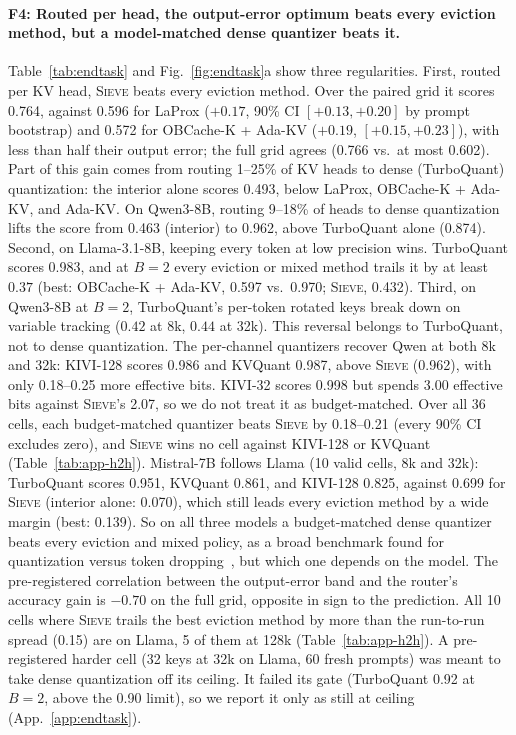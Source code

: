 \documentclass{article}
\newcommand{\sieve}{\textsc{Sieve}}
\theoremstyle{definition}
\begin{document}
\paragraph{F4: Routed per head, the output-error optimum beats every eviction method, but a model-matched dense quantizer beats it.}
Table~\ref{tab:endtask} and Fig.~\ref{fig:endtask}a show three regularities.  First, routed per KV head, \sieve{} beats every eviction method.  Over the paired grid it scores 0.764, against 0.596 for LaProx ($+0.17$, 90\% CI $[+0.13,+0.20]$ by prompt bootstrap) and 0.572 for OBCache-K + Ada-KV ($+0.19$, $[+0.15,+0.23]$), with less than half their output error; the full grid agrees (0.766 vs.\ at most 0.602).  Part of this gain comes from routing 1--25\% of KV heads to dense (TurboQuant) quantization: the interior alone scores 0.493, below LaProx, OBCache-K + Ada-KV, and Ada-KV.  On Qwen3-8B, routing 9--18\% of heads to dense quantization lifts the score from 0.463 (interior) to 0.962, above TurboQuant alone (0.874).  Second, on Llama-3.1-8B, keeping every token at low precision wins.  TurboQuant scores 0.983, and at $B=2$ every eviction or mixed method trails it by at least $0.37$ (best: OBCache-K + Ada-KV, 0.597 vs.\ 0.970; \sieve{}, 0.432).  Third, on Qwen3-8B at $B=2$, TurboQuant's per-token rotated keys break down on variable tracking ($0.42$ at 8k, $0.44$ at 32k).  This reversal belongs to TurboQuant, not to dense quantization.  The per-channel quantizers recover Qwen at both 8k and 32k: KIVI-128 scores 0.986 and KVQuant 0.987, above \sieve{} (0.962), with only 0.18--0.25 more effective bits.  KIVI-32 scores 0.998 but spends 3.00 effective bits against \sieve{}'s 2.07, so we do not treat it as budget-matched.  Over all 36 cells, each budget-matched quantizer beats \sieve{} by 0.18--0.21 (every 90\% CI excludes zero), and \sieve{} wins no cell against KIVI-128 or KVQuant (Table~\ref{tab:app-h2h}).  Mistral-7B follows Llama (10 valid cells, 8k and 32k): TurboQuant scores 0.951, KVQuant 0.861, and KIVI-128 0.825, against 0.699 for \sieve{} (interior alone: 0.070), which still leads every eviction method by a wide margin (best: 0.139).  So on all three models a budget-matched dense quantizer beats every eviction and mixed policy, as a broad benchmark found for quantization versus token dropping~\citep{yuan2024kvbench}, but which one depends on the model.  The pre-registered correlation between the output-error band and the router's accuracy gain is $-0.70$ on the full grid, opposite in sign to the prediction.  All 10 cells where \sieve{} trails the best eviction method by more than the run-to-run spread (0.15) are on Llama, 5 of them at 128k (Table~\ref{tab:app-h2h}).  A pre-registered harder cell (32 keys at 32k on Llama, 60 fresh prompts) was meant to take dense quantization off its ceiling.  It failed its gate (TurboQuant 0.92 at $B=2$, above the 0.90 limit), so we report it only as still at ceiling (App.~\ref{app:endtask}).
\end{document}
